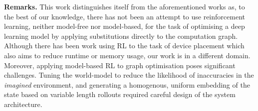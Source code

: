 \textbf{Remarks.} This work distinguishes itself from the aforementioned works as, to the best of our knowledge, there has not been an attempt to use reinforcement learning, neither model-free nor model-based, for the task of optimising a deep learning model by applying substitutions directly to the computation graph. Although there has been work using RL to the task of device placement \cite{addanki2019placeto, paliwal2020reinforced} which also aims to reduce runtime or memory usage, our work is in a different domain. Moreover, applying model-based RL to graph optimisation poses significant challenges. Tuning the world-model to reduce the likelihood of inaccuracies in the \textit{imagined} environment, and generating a homogenous, uniform embedding of the state based on variable length rollouts required careful design of the system architecture.


